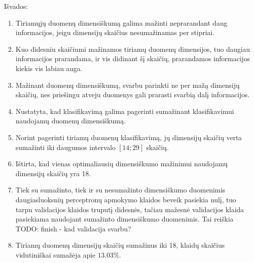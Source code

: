 \documentclass{VUMIFPSbakalaurinis}
\newcommand{\TODO}[1]{
\colorbox{todo-background-color}{TODO: #1}
}
\begin{document}
Išvados:
\begin{enumerate}
	\item Tiriamųjų duomenų dimensiškumą galima mažinti neprarandant daug informacijos, jeigu dimensijų skaičius nesumažinamas per stipriai.
	\item Kuo didesniu skaičiumi mažinamos tiriamų duomenų dimensijos, tuo daugiau informacijos prarandama, ir vis didinant šį skaičių, prarandamos informacijos kiekis vis labiau auga.
	\item Mažinant duomenų dimensiškumą, svarbu parinkti ne per mažą dimensijų skaičių, nes priešingu atveju duomenys gali prarasti svarbią dalį informacijos.
	\item Nustatyta, kad klasifikavimą galima pagerinti sumažinant klasifikavimui naudojamų duomenų dimensiškumą.
	\item Norint pagerinti tiriamų duomenų klasifikavimą, jų dimensijų skaičių verta sumažinti iki daugumos intervalo $[14; 29]$ skaičių.
	\item Ištirta, kad vienas optimaliausių dimensiškumo mažinimui naudojamų dimensijų skaičių yra 18.

	\item Tiek su sumažinto, tiek ir su nesumažinto dimensiškumo duomenimis daugiasluoksnių perceptronų apmokymo klaidos beveik pasiekia nulį, tuo tarpu validacijos klaidos truputį didesnės, tačiau mažesnė validacijos klaida pasiekiama naudojant sumažinto dimensiškumo duomenimis. Tai reiškia \TODO{finish - kad validacija svarbu?}
		
	\item Tiriamų duomenų dimensijų skaičių sumažinus iki 18, klaidų skaičius vidutiniškai sumažėja apie $13.03\%$.
\end{enumerate}



\printbibliography[heading=bibintoc]  %

\end{document}
